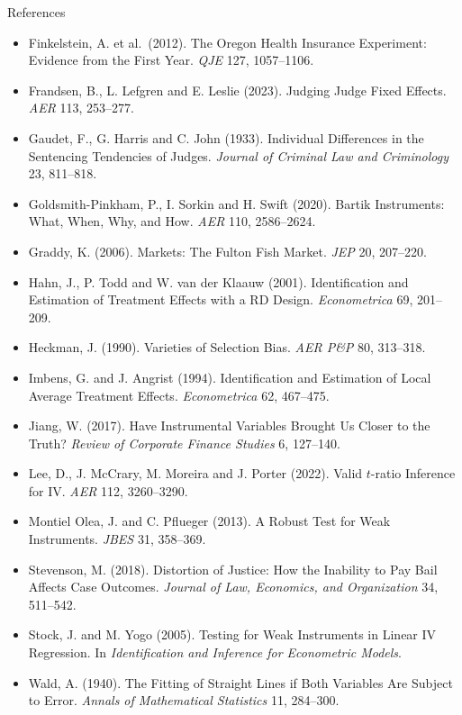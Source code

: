 \documentclass[
  11pt,
  ignorenonframetext,
  aspectratio=169,
]{beamer}
\begin{document}
\begin{frame}{References}
\begin{itemize}
\item
  Finkelstein, A. et al.~(2012). The Oregon Health Insurance Experiment:
  Evidence from the First Year. \emph{QJE} 127, 1057--1106.
\item
  Frandsen, B., L. Lefgren and E. Leslie (2023). Judging Judge Fixed
  Effects. \emph{AER} 113, 253--277.
\item
  Gaudet, F., G. Harris and C. John (1933). Individual Differences in
  the Sentencing Tendencies of Judges. \emph{Journal of Criminal Law and
  Criminology} 23, 811--818.
\item
  Goldsmith-Pinkham, P., I. Sorkin and H. Swift (2020). Bartik
  Instruments: What, When, Why, and How. \emph{AER} 110, 2586--2624.
\item
  Graddy, K. (2006). Markets: The Fulton Fish Market. \emph{JEP} 20,
  207--220.
\item
  Hahn, J., P. Todd and W. van der Klaauw (2001). Identification and
  Estimation of Treatment Effects with a RD Design. \emph{Econometrica}
  69, 201--209.
\item
  Heckman, J. (1990). Varieties of Selection Bias. \emph{AER P\&P} 80,
  313--318.
\item
  Imbens, G. and J. Angrist (1994). Identification and Estimation of
  Local Average Treatment Effects. \emph{Econometrica} 62, 467--475.
\item
  Jiang, W. (2017). Have Instrumental Variables Brought Us Closer to the
  Truth? \emph{Review of Corporate Finance Studies} 6, 127--140.
\item
  Lee, D., J. McCrary, M. Moreira and J. Porter (2022). Valid
  \(t\)-ratio Inference for IV. \emph{AER} 112, 3260--3290.
\item
  Montiel Olea, J. and C. Pflueger (2013). A Robust Test for Weak
  Instruments. \emph{JBES} 31, 358--369.
\item
  Stevenson, M. (2018). Distortion of Justice: How the Inability to Pay
  Bail Affects Case Outcomes. \emph{Journal of Law, Economics, and
  Organization} 34, 511--542.
\item
  Stock, J. and M. Yogo (2005). Testing for Weak Instruments in Linear
  IV Regression. In \emph{Identification and Inference for Econometric
  Models}.
\item
  Wald, A. (1940). The Fitting of Straight Lines if Both Variables Are
  Subject to Error. \emph{Annals of Mathematical Statistics} 11,
  284--300.
\end{itemize}
\end{frame}
\end{document}
